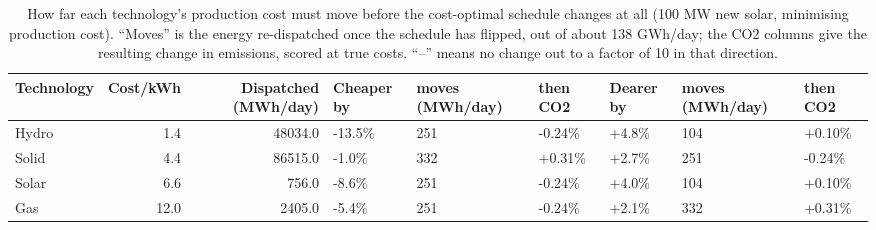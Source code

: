 \begin{table}
\caption{How far each technology's production cost must move before the cost-optimal schedule changes at all (100 MW new solar, minimising production cost). ``Moves'' is the energy re-dispatched once the schedule has flipped, out of about 138 GWh/day; the CO2 columns give the resulting change in emissions, scored at true costs. ``--'' means no change out to a factor of 10 in that direction.}
\label{tab:stability}
\begin{tabular}{lrrllllll}
\toprule
Technology & Cost/kWh & Dispatched (MWh/day) & Cheaper by & moves (MWh/day) & then CO2 & Dearer by & moves (MWh/day)  & then CO2  \\
\midrule
Hydro & 1.4 & 48034.0 & -13.5\% & 251 & -0.24\% & +4.8\% & 104 & +0.10\% \\
Solid & 4.4 & 86515.0 & -1.0\% & 332 & +0.31\% & +2.7\% & 251 & -0.24\% \\
Solar & 6.6 & 756.0 & -8.6\% & 251 & -0.24\% & +4.0\% & 104 & +0.10\% \\
Gas & 12.0 & 2405.0 & -5.4\% & 251 & -0.24\% & +2.1\% & 332 & +0.31\% \\
\bottomrule
\end{tabular}
\end{table}

